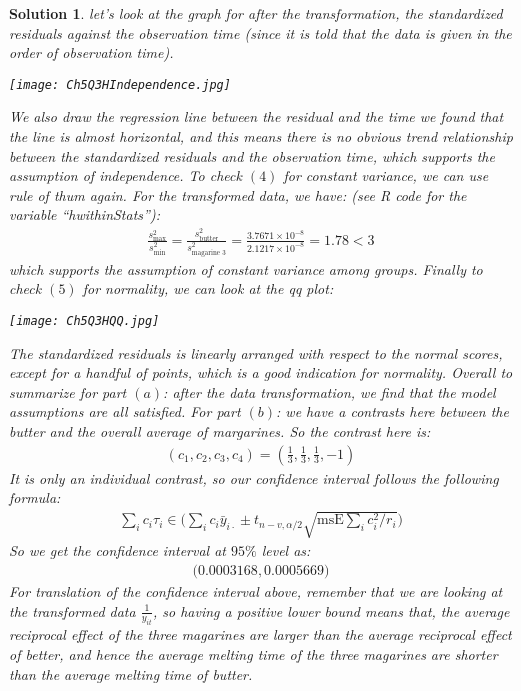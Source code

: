 \documentclass[11pt]{article}
\newtheorem{sol}{Solution}
\begin{document}
\begin{sol}
	let's look at the graph for after the transformation, the standardized residuals against the observation time (since it is told that the data is given in the order of observation time).\vskip 2mm
	\begin{center}
		\texttt{[image: Ch5Q3HIndependence.jpg]}
	\end{center}
	We also draw the regression line between the residual and the time we found that the line is almost horizontal, and this means there is no obvious trend relationship between the standardized residuals and the observation time, which supports the assumption of independence.\vskip 2mm
	To check $(4)$ for constant variance, we can use rule of thum again. For the transformed data, we have: (see R code for the variable ``hwithinStats''):
	\begin{align*}
		\frac{s^2_{\max}}{s^2_{\min}} = \frac{s^2_{\text{butter}}}{s^2_{\text{magarine }3}} = \frac{3.7671 \times 10^{-8}}{2.1217 \times 10^{-8}} = 1.78 < 3
	\end{align*}
	which supports the assumption of constant variance among groups.\vskip 2mm
	Finally to check $(5)$ for normality, we can look at the qq plot:\vskip 2mm
	\begin{center}
		\texttt{[image: Ch5Q3HQQ.jpg]}
	\end{center}
	The standardized residuals is linearly arranged with respect to the normal scores, except for a handful of points, which is a good indication for normality.\vskip 2mm
	Overall to summarize for part $(a)$: after the data transformation, we find that the model assumptions are all satisfied.\vskip 2mm
	For part $(b)$:\vskip 2mm
	we have a contrasts here between the butter and the overall average of margarines. So the contrast here is:\vskip 2mm
	\begin{align*}
		(c_1, c_2, c_3, c_4) = (\frac{1}{3}, \frac{1}{3}, \frac{1}{3}, -1)
	\end{align*}
	It is only an individual contrast, so our confidence interval follows the following formula:
	\begin{align*}
		\sum_i c_i\tau_i \in \Big(\sum_ic_i\bar{y}_{i\cdot} \pm t_{n - v, \alpha/2}\sqrt{\text{msE}\sum_ic_i^2/r_i}\Big)
	\end{align*}
	So we get the confidence interval at $95\%$ level as:
	\begin{align*}
		\Big(0.0003168, 0.0005669\Big)
	\end{align*}
	For translation of the confidence interval above, remember that we are looking at the transformed data $\frac{1}{y_{it}}$, so having a positive lower bound means that, the average reciprocal effect of the three magarines are larger than the average reciprocal effect of better, and hence the average melting time of the three magarines are shorter than the average melting time of butter.

\end{sol}
\end{document}
